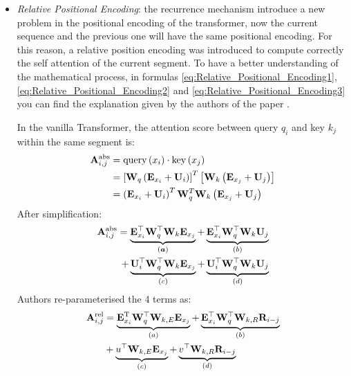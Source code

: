 \begin{itemize}
	\item \textit{Relative Positional Encoding}: the recurrence mechanism introduce a new problem in the positional encoding of the transformer, now the current sequence and the previous one will have the same positional encoding. For this reason, a relative position encoding was introduced to compute correctly the self attention of the current segment. To have a better understanding of the mathematical process, in formulas  \ref{eq:Relative_Positional_Encoding1}, \ref{eq:Relative_Positional_Encoding2} and \ref{eq:Relative_Positional_Encoding3} you can find the explanation given by the authors of the paper \cite{tranformerxl}.
	
	In the vanilla Transformer, the attention score between query $q_{i}$ and key $k_{j}$ within the same segment is:
	\begin{align}
	\label{eq:Relative_Positional_Encoding1}
	\mathbf{A}_{i, j}^{\mathrm{abs}} &=\operatorname{query}\left(x_{i}\right) \cdot \operatorname{key}\left(x_{j}\right) \notag\\
	&=\left[\mathbf{W}_{q}\left(\mathbf{E}_{x_{i}}+\mathbf{U}_{i}\right)\right]^{T}\left[\mathbf{W}_{k}\left(\mathbf{E}_{x_{j}}+\mathbf{U}_{j}\right)\right] \\
	&=\left(\mathbf{E}_{x_{i}}+\mathbf{U}_{i}\right)^{T} \mathbf{W}_{q}^{T} \mathbf{W}_{k}\left(\mathbf{E}_{x_{j}}+\mathbf{U}_{j}\right) \notag
	\end{align}
	After simplification:
	\begin{align}
	\label{eq:Relative_Positional_Encoding2}
	\mathbf{A}_{i, j}^{\mathrm{abs}} =\underbrace{\mathbf{E}_{x_{i}}^{\top} \mathbf{W}_{q}^{\top} \mathbf{W}_{k} \mathbf{E}_{x_{j}}}_{(\boldsymbol{a})}+\underbrace{\mathbf{E}_{x_{i}}^{\top} \mathbf{W}_{q}^{\top} \mathbf{W}_{k} \mathbf{U}_{j}}_{(b)} \notag\\
	+\underbrace{\mathbf{U}_{i}^{\top} \mathbf{W}_{q}^{\top} \mathbf{W}_{k} \mathbf{E}_{x_{j}}}_{(c)}+\underbrace{\mathbf{U}_{i}^{\top} \mathbf{W}_{q}^{\top} \mathbf{W}_{k} \mathbf{U}_{j}}_{(d)}
	\end{align}
	Authors re-parameterised the 4 terms as:
	\begin{align}
	\label{eq:Relative_Positional_Encoding3}
	\mathbf{A}_{i, j}^{\mathrm{rel}} &=\underbrace{\mathbf{E}_{x_{i}}^{\mathrm{T}} \mathbf{W}_{q}^{\top} \mathbf{W}_{k, E} \mathbf{E}_{x_{j}}}_{(a)}+\underbrace{\mathbf{E}_{x_{i}}^{\top} \mathbf{W}_{q}^{\top} \mathbf{W}_{k, R} \mathbf{R}_{i-j}}_{(b)} \notag\\
	&+\underbrace{u^{\top} \mathbf{W}_{k, E} \mathbf{E}_{x_{j}}}_{(c)}+\underbrace{v^{\top} \mathbf{W}_{k, R} \mathbf{R}_{i-j}}_{(d)}

\end{align}
\end{itemize}
